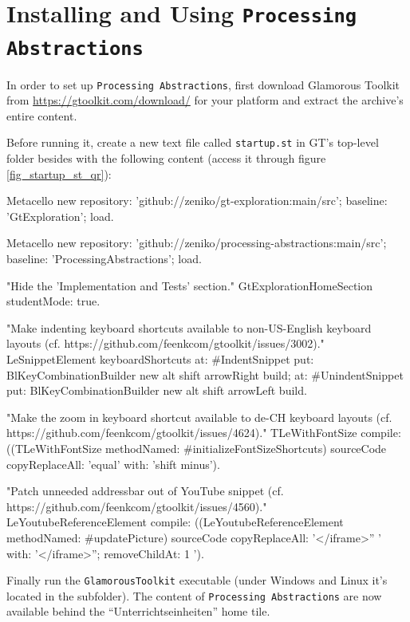 
\chapter{Installing and Using \texttt{Processing Abstractions}} \label{app_setup}

In order to set up \texttt{Processing Abstractions}, first download Glamorous Toolkit from \url{https://gtoolkit.com/download/} for your platform and extract the archive's entire content.

Before running it, create a new text file called \texttt{startup.st} in GT's top-level folder besides  with the following content (access it through figure \ref{fig_startup_st_qr}):

\begin{code}
Metacello new
	repository: 'github://zeniko/gt-exploration:main/src';
	baseline: 'GtExploration';
	load.

Metacello new
	repository: 'github://zeniko/processing-abstractions:main/src';
	baseline: 'ProcessingAbstractions';
	load.

"Hide the 'Implementation and Tests' section."
GtExplorationHomeSection studentMode: true.

"Make indenting keyboard shortcuts available to non-US-English keyboard layouts
(cf. https://github.com/feenkcom/gtoolkit/issues/3002)."
LeSnippetElement keyboardShortcuts
	at: #IndentSnippet
		put: BlKeyCombinationBuilder new alt shift arrowRight build;
	at: #UnindentSnippet
		put: BlKeyCombinationBuilder new alt shift arrowLeft build.

"Make the zoom in keyboard shortcut available to de-CH keyboard layouts
(cf. https://github.com/feenkcom/gtoolkit/issues/4624)."
TLeWithFontSize compile:
	((TLeWithFontSize methodNamed: #initializeFontSizeShortcuts) sourceCode
		copyReplaceAll: 'equal' with: 'shift minus').

"Patch unneeded addressbar out of YouTube snippet
(cf. https://github.com/feenkcom/gtoolkit/issues/4560)."
LeYoutubeReferenceElement compile:
	((LeYoutubeReferenceElement methodNamed: #updatePicture) sourceCode
		copyReplaceAll: '</iframe>'' ' with: '</iframe>''; removeChildAt: 1 ').
\end{code}

Finally run the \texttt{GlamorousToolkit} executable (under Windows and Linux it's located in the  subfolder). The content of \texttt{Processing Abstractions} are now available behind the ``Unterrichtseinheiten'' home tile.

